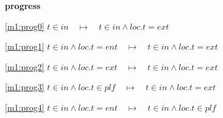 \textbf{progress}
\begin{block}
\item[ \eqref{m1:prog0} ]{$t \in in  \quad \mapsto\quad t \in in \land loc.t = ext $} %
\item[ \eqref{m1:prog1} ]{$t \in in \land loc.t = ent  \quad \mapsto\quad t \in in \land loc.t = ext $} %
\item[ \eqref{m1:prog2} ]{$t \in in \land loc.t = ext  \quad \mapsto\quad t \in in \land loc.t = ext $} %
\item[ \eqref{m1:prog3} ]{$t \in in \land loc.t \in plf  \quad \mapsto\quad t \in in \land loc.t = ext $} %
\item[ \eqref{m1:prog4} ]{$t \in in \land loc.t = ent  \quad \mapsto\quad t \in in \land loc.t \in plf $} %
\end{block}
